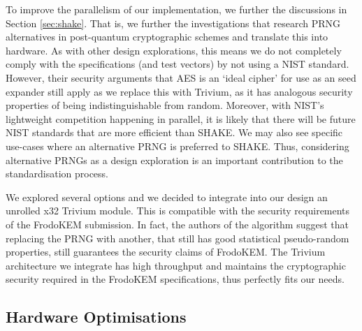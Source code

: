 To improve the parallelism of our implementation, we further the discussions in Section \ref{sec:shake}. That is, we further the investigations that research PRNG alternatives in post-quantum cryptographic schemes and translate this into hardware. As with other design explorations, this means we do not completely comply with the specifications (and test vectors) by not using a NIST standard. However, their security arguments that AES is an `ideal cipher' for use as an seed expander still apply as we replace this with Trivium, as it has analogous security properties of being indistinguishable from random. Moreover, with NIST's lightweight competition happening in parallel, it is likely that there will be future NIST standards that are more efficient than SHAKE. We may also see specific use-cases where an alternative PRNG is preferred to SHAKE. Thus, considering alternative PRNGs as a design exploration is an important contribution to the standardisation process.

We explored several options and we decided to integrate into our design an unrolled x32 Trivium \cite{de2008trivium} module. This is compatible with the security requirements of the FrodoKEM submission. In fact, the authors of the algorithm suggest that replacing the PRNG with another, that still has good statistical pseudo-random properties, still guarantees the security claims of FrodoKEM. The Trivium architecture we integrate has high throughput and maintains the cryptographic security required in the FrodoKEM specifications, thus perfectly fits our needs. %

\vspace{-0.2cm}

\subsection{Hardware Optimisations}

